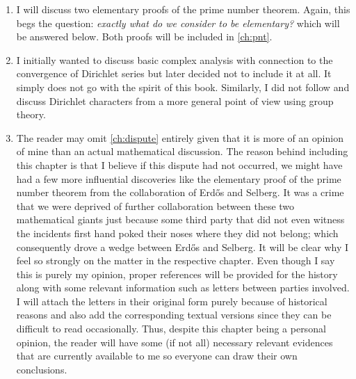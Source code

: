 \documentclass[12pt,leqno,]{book}
\theoremstyle{definition}
\theoremstyle{definition}
\begin{document}
\begin{enumerate}[(1)]
			\item I will discuss two elementary proofs of the prime number theorem. Again, this begs the question: \textit{exactly what do we consider to be elementary?} which will be answered below. Both proofs will be included in \autoref{ch:pnt}.
			\item I initially wanted to discuss basic complex analysis with connection to the convergence of Dirichlet series but later decided not to include it at all. It simply does not go with the spirit of this book. Similarly, I did not follow \textcite{apostol_1976} and discuss Dirichlet characters from a more general point of view using group theory.
			\item The reader may omit \autoref{ch:dispute} entirely given that it is more of an opinion of mine than an actual mathematical discussion. The reason behind including this chapter is that I believe if this dispute had not occurred, we might have had a few more influential discoveries like the elementary proof of the prime number theorem from the collaboration of Erd\H{o}s and Selberg. It was a crime that we were deprived of further collaboration between these two mathematical giants just because some third party that did not even witness the incidents first hand poked their noses where they did not belong; which consequently drove a wedge between Erd\H{o}s and Selberg. It will be clear why I feel so strongly on the matter in the respective chapter. Even though I say this is purely my opinion, proper references will be provided for the history along with some relevant information such as letters between parties involved. I will attach the letters in their original form purely because of historical reasons and also add the corresponding textual versions since they can be difficult to read occasionally. Thus, despite this chapter being a personal opinion, the reader will have some (if not all) necessary relevant evidences that are currently available to me so everyone can draw their own conclusions.
		\end{enumerate}
\end{document}

